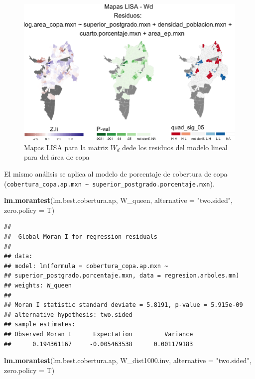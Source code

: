 \documentclass[12pt,]{book}
\newenvironment{Shaded}{\begin{snugshade}}{\end{snugshade}}
\newcommand{\KeywordTok}[1]{\textcolor[rgb]{0.13,0.29,0.53}{\textbf{#1}}}
\newcommand{\DataTypeTok}[1]{\textcolor[rgb]{0.13,0.29,0.53}{#1}}
\newcommand{\StringTok}[1]{\textcolor[rgb]{0.31,0.60,0.02}{#1}}
\newcommand{\NormalTok}[1]{#1}
\begin{document}
\begin{figure}
\includegraphics[width=1\linewidth]{tesis-unigis_files/figure-latex/mapas-lisa-rescopa-wd-1} \caption{Mapas LISA para la matriz $W_d$ dede los residuos del modelo lineal para del área de copa}\label{fig:mapas-lisa-rescopa-wd}
\end{figure}

El mismo análisis se aplica al modelo de porcentaje de cobertura de copa
(\texttt{cobertura\_copa.ap.mxn\ \textasciitilde{}\ superior\_postgrado.porcentaje.mxn}).

\begin{Shaded}
\begin{Highlighting}[]
\KeywordTok{lm.morantest}\NormalTok{(lm.best.cobertura.ap, W_queen, }\DataTypeTok{alternative =} \StringTok{"two.sided"}\NormalTok{, }\DataTypeTok{zero.policy =}\NormalTok{ T)}
\end{Highlighting}
\end{Shaded}

\begin{verbatim}
## 
##  Global Moran I for regression residuals
## 
## data:  
## model: lm(formula = cobertura_copa.ap.mxn ~
## superior_postgrado.porcentaje.mxn, data = regresion.arboles.mn)
## weights: W_queen
## 
## Moran I statistic standard deviate = 5.8191, p-value = 5.915e-09
## alternative hypothesis: two.sided
## sample estimates:
## Observed Moran I      Expectation         Variance 
##      0.194361167     -0.005463538      0.001179183
\end{verbatim}

\begin{Shaded}
\begin{Highlighting}[]
\KeywordTok{lm.morantest}\NormalTok{(lm.best.cobertura.ap, W_dist1000.inv, }\DataTypeTok{alternative =} \StringTok{"two.sided"}\NormalTok{, }
    \DataTypeTok{zero.policy =}\NormalTok{ T)}
\end{Highlighting}
\end{Shaded}
\end{document}
